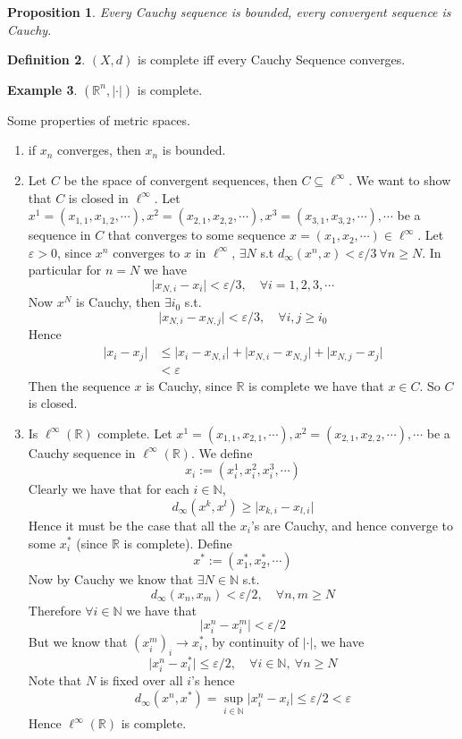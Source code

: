 \documentclass[11pt,a4paper]{article}
\theoremstyle{definition}
\newtheorem{definition}{Definition}[section]
\newtheorem{example}[definition]{Example}
\theoremstyle{plain}
\newtheorem{proposition}[definition]{Proposition}
\theoremstyle{remark}
\newcommand{\R}{\mathbb{R}}
\newcommand{\N}{\mathbb{N}}
\newcommand{\abs}[1]{\lvert #1 \rvert}
\newcommand{\1}{\mathbbm{1}}
\begin{document}
\begin{proposition}
    Every Cauchy sequence is bounded, every convergent sequence is Cauchy.
\end{proposition}

\begin{definition}
    $(X,d)$ is complete iff every Cauchy Sequence converges.
\end{definition}

\begin{example}
    $(\R^n, \abs{\cdot})$ is complete.
\end{example}

Some properties of metric spaces.
\begin{enumerate}[label = \roman*)]
    \item if $x_n$ converges, then $x_n$ is bounded. 
    
    \item Let $C$ be the space of convergent sequences, then $C \subseteq \ell^\infty$. We want to show that $C$ is closed in $\ell^\infty$. 
    Let $x^1 = (x_{1,1}, x_{1,2}, \cdots), x^2 = (x_{2, 1}, x_{2,2}, \cdots), x^3 = (x_{3, 1}, x_{3,2}, \cdots), \cdots$ be a sequence in $C$ that converges to some sequence $x = (x_1, x_2, \cdots) \in \ell^\infty$. 
    Let $\varepsilon > 0$, since $x^n$ converges to $x$ in $\ell^\infty$, $\exists N$ s.t $d_\infty(x^n, x) < \varepsilon/3 \ \forall n \ge N$. In particular for $n = N$ we have 
    $$\abs{x_{N,i} - x_i} < \varepsilon/3, \quad \forall i = 1,2,3,\cdots$$
    Now $x^N$ is Cauchy, then $\exists i_0$ s.t.
    $$\abs{x_{N,i} - x_{N,j}} < \varepsilon/3, \quad \forall i,j \ge i_0$$
    Hence 
    \begin{align*}
        \abs{x_i - x_j} &\le \abs{x_i - x_{N,i}} + \abs{x_{N,i} - x_{N,j}} + \abs{x_{N,j} - x_j} \\
        &< \varepsilon
    \end{align*}
    Then the sequence $x$ is Cauchy, since $\R$ is complete we have that $x \in C$. So $C$ is closed. 

    \item Is $\ell^\infty(\R)$ complete. Let $x^1 = (x_{1,1}, x_{2,1}, \cdots), x^2 = (x_{2,1}, x_{2,2}, \cdots), \cdots$ be a Cauchy sequence in $\ell^\infty(\R)$. We define 
    $$x_i := (x_{i}^1, x_{i}^2, x_{i}^3, \cdots)$$
    Clearly we have that for each $i \in \N$, 
    $$d_\infty (x^k, x^l) \ge \abs{x_{k,i} - x_{l, i}}$$
    Hence it must be the case that all the $x_i$'s are Cauchy, and hence converge to some $x_{i}^*$ (since $\R$ is complete). Define 
    $$x^* := (x_1^*, x_2^*, \cdots)$$
    Now by Cauchy we know that $\exists N \in \N$ s.t. 
    $$d_\infty(x_n, x_m) < \varepsilon/2, \quad \forall n,m \ge N$$
    Therefore $\forall i \in \N$ we have that 
    $$\abs{x^n_i - x_i^m} < \varepsilon/2$$
    But we know that $(x^m_i)_i \to x^*_i$, by continuity of $\abs{\cdot}$, we have 
    $$\abs{x^n_i - x_i^*} \le \varepsilon/2, \quad \forall i \in \N, \ \forall n \ge N$$
    Note that $N$ is fixed over all $i$'s hence 
    $$d_\infty (x^n, x^*) = \sup_{i \in \N} \abs{x^n_i - x_i} \le \varepsilon/2 < \varepsilon$$
    Hence $\ell^\infty(\R)$ is complete.


\end{enumerate}
\end{document}
